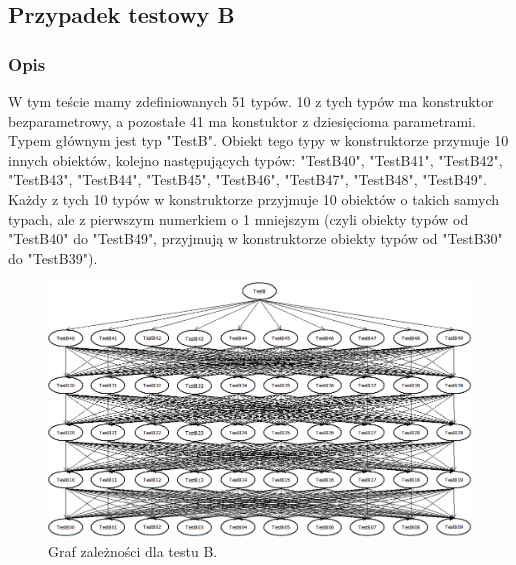 \documentclass[12pt]{article}
\begin{document}
\subsection{Przypadek testowy B}
\subsubsection{Opis}
W tym teście mamy zdefiniowanych 51 typów. 10 z tych typów ma konstruktor bezparametrowy, a pozostałe 41 ma konstuktor z dziesięcioma parametrami. Typem głównym jest typ "TestB". Obiekt tego typy w konstruktorze przymuje 10 innych obiektów, kolejno następujących typów: "TestB40", "TestB41", "TestB42", "TestB43", "TestB44", "TestB45", "TestB46", "TestB47", "TestB48", "TestB49". Każdy z tych 10 typów w konstruktorze przyjmuje 10 obiektów o takich samych typach, ale z pierwszym numerkiem o 1 mniejszym (czyli obiekty typów od "TestB40" do "TestB49", przyjmują w konstruktorze obiekty typów od "TestB30" do "TestB39").

\begin{figure}[h]
	\begin{center}
  		\includegraphics[width=\linewidth]{TestB.png}
  		\caption{Graf zależności dla testu B.}
  		\label{fig:testB}
	\end{center}
\end{figure}
\end{document}

